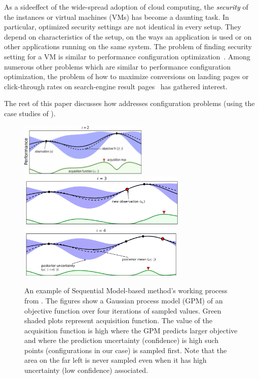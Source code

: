 As a sideeffect of the wide-spread adoption of cloud computing, the \textcolor{black}{{\em security}} of the instances or virtual machines (VMs) has become a daunting task. In particular, optimized security settings are not identical in every setup. They depend on characteristics of the setup, on the ways an application is used or on other applications running on the same system. The problem of finding security setting for a VM is similar to performance configuration optimization~\cite{biedermann2014hot, biedermann2014leveraging, drabik2003method, security1, security2}. 
Among numerous other problems which are similar to performance configuration optimization, the problem of how to maximize conversions on landing pages or click-through rates on search-engine result pages~\cite{hill2017efficient, wang2016beyond, zhu2017optimized} has gathered interest.  


The rest of this paper discusses how \flash addresses configuration problems (using
the case studies of ). 

\begin{figure}[!htb]
      \includegraphics[width=\linewidth, height=1in]{Figures/bayesian_1.png}
    \endminipage\hfill
      \includegraphics[width=\linewidth, height=1in]{Figures/bayesian_2.png}
    \endminipage\hfill
      \includegraphics[width=\linewidth, height=1in]{Figures/bayesian_3.png}
    \endminipage
\caption{An example of Sequential Model-based method's working process from \cite{brochu2010tutorial}. The figures show a Gaussian process model (GPM) of an objective function over
four iterations of sampled values.
Green shaded plots represent acquisition function. The value of the acquisition function is high where the GPM predicts larger objective and where the prediction uncertainty (confidence) is high such points (configurations in our case) is sampled first. Note that the area on the far left is never sampled even when it has high uncertainty (low confidence) associated.} 
\label{fig:bayesian_optimazation}
\end{figure}

